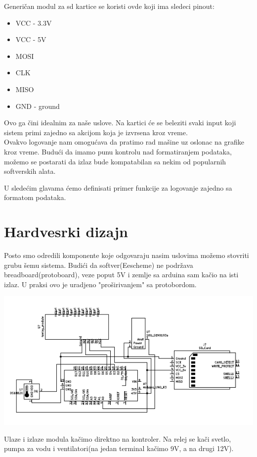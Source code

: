 \documentclass[a4paper,11pt]{book}
\begin{document}
Generičan modul za sd kartice se koristi ovde koji ima sledeci pinout:

\hrulefill
\begin{itemize}
  \item VCC - 3.3V
  \item VCC - 5V
  \item MOSI
  \item CLK 
  \item MISO
  \item GND - ground
\end{itemize}
\hrulefill

Ovo ga čini idealnim za naše uslove. Na kartici će se beleziti svaki input koji sistem primi zajedno sa akcijom koja je izvrsena kroz vreme. \\

Ovakvo logovanje nam omogućava da pratimo rad mašine uz oslonac na grafike kroz vreme. Budući da imamo punu kontrolu nad formatiranjem podataka, možemo se postarati da izlaz bude kompatabilan sa nekim od popularnih softverskih alata. 

U sledećim glavama ćemo definisati primer funkcije za logovanje zajedno sa formatom podataka.

\section{Hardvesrki dizajn}

Posto smo odredili komponente koje odgovaraju nasim uslovima možemo stovriti grubu šemu sistema. Budići da softver(Eescheme) ne podržava breadboard(protoboard), veze poput 5V i zemlje sa arduina sam kačio na isti izlaz. U praksi ovo je uradjeno "proširivanjem" sa protobordom.

\includegraphics[width=\textwidth]{kontroler.png}

Ulaze i izlaze modula kačimo direktno na kontroler. Na relej se kači svetlo, pumpa za vodu i ventilatori(na jedan terminal kačimo 9V, a na drugi 12V).
\end{document}
